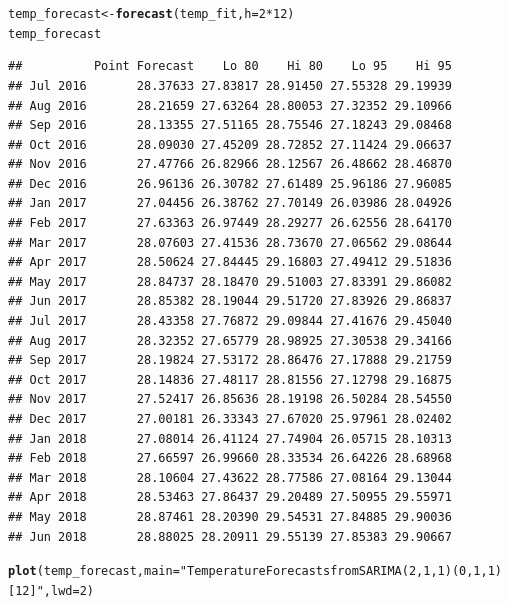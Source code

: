 \documentclass[10pt]{article}\usepackage[]{graphicx}\usepackage[]{color}
\makeatletter
\newcommand{\hlnum}[1]{\textcolor[rgb]{0.686,0.059,0.569}{#1}}%
\newcommand{\hlstr}[1]{\textcolor[rgb]{0.192,0.494,0.8}{#1}}%
\newcommand{\hlopt}[1]{\textcolor[rgb]{0,0,0}{#1}}%
\newcommand{\hlstd}[1]{\textcolor[rgb]{0.345,0.345,0.345}{#1}}%
\newcommand{\hlkwb}[1]{\textcolor[rgb]{0.69,0.353,0.396}{#1}}%
\newcommand{\hlkwc}[1]{\textcolor[rgb]{0.333,0.667,0.333}{#1}}%
\newcommand{\hlkwd}[1]{\textcolor[rgb]{0.737,0.353,0.396}{\textbf{#1}}}%
\newenvironment{kframe}{%
 \def\at@end@of@kframe{}%
 \ifinner\ifhmode%
  \def\at@end@of@kframe{\end{minipage}}%
  \begin{minipage}{\columnwidth}%
 \fi\fi%
 \def\FrameCommand##1{\hskip\@totalleftmargin \hskip-\fboxsep
 \colorbox{shadecolor}{##1}\hskip-\fboxsep
     \hskip-\linewidth \hskip-\@totalleftmargin \hskip\columnwidth}%
 \MakeFramed {\advance\hsize-\width
   \@totalleftmargin\z@ \linewidth\hsize
   \@setminipage}}%
 {\par\unskip\endMakeFramed%
 \at@end@of@kframe}
\newenvironment{knitrout}{}{} %
\makeatother
\begin{document}
\begin{knitrout}
\color{fgcolor}\begin{kframe}
\begin{alltt}
\hlstd{temp_forecast} \hlkwb{<-} \hlkwd{forecast}\hlstd{(temp_fit,} \hlkwc{h} \hlstd{=} \hlnum{2}\hlopt{*}\hlnum{12}\hlstd{)}
\hlstd{temp_forecast}
\end{alltt}
\begin{verbatim}
##          Point Forecast    Lo 80    Hi 80    Lo 95    Hi 95
## Jul 2016       28.37633 27.83817 28.91450 27.55328 29.19939
## Aug 2016       28.21659 27.63264 28.80053 27.32352 29.10966
## Sep 2016       28.13355 27.51165 28.75546 27.18243 29.08468
## Oct 2016       28.09030 27.45209 28.72852 27.11424 29.06637
## Nov 2016       27.47766 26.82966 28.12567 26.48662 28.46870
## Dec 2016       26.96136 26.30782 27.61489 25.96186 27.96085
## Jan 2017       27.04456 26.38762 27.70149 26.03986 28.04926
## Feb 2017       27.63363 26.97449 28.29277 26.62556 28.64170
## Mar 2017       28.07603 27.41536 28.73670 27.06562 29.08644
## Apr 2017       28.50624 27.84445 29.16803 27.49412 29.51836
## May 2017       28.84737 28.18470 29.51003 27.83391 29.86082
## Jun 2017       28.85382 28.19044 29.51720 27.83926 29.86837
## Jul 2017       28.43358 27.76872 29.09844 27.41676 29.45040
## Aug 2017       28.32352 27.65779 28.98925 27.30538 29.34166
## Sep 2017       28.19824 27.53172 28.86476 27.17888 29.21759
## Oct 2017       28.14836 27.48117 28.81556 27.12798 29.16875
## Nov 2017       27.52417 26.85636 28.19198 26.50284 28.54550
## Dec 2017       27.00181 26.33343 27.67020 25.97961 28.02402
## Jan 2018       27.08014 26.41124 27.74904 26.05715 28.10313
## Feb 2018       27.66597 26.99660 28.33534 26.64226 28.68968
## Mar 2018       28.10604 27.43622 28.77586 27.08164 29.13044
## Apr 2018       28.53463 27.86437 29.20489 27.50955 29.55971
## May 2018       28.87461 28.20390 29.54531 27.84885 29.90036
## Jun 2018       28.88025 28.20911 29.55139 27.85383 29.90667
\end{verbatim}
\begin{alltt}
\hlkwd{plot}\hlstd{(temp_forecast,} \hlkwc{main} \hlstd{=} \hlstr{"Temperature Forecasts from SARIMA(2,1,1)(0,1,1)[12]"}\hlstd{,}\hlkwc{lwd} \hlstd{=} \hlnum{2}\hlstd{)}
\end{alltt}
\end{kframe}

\end{knitrout}
\end{document}
